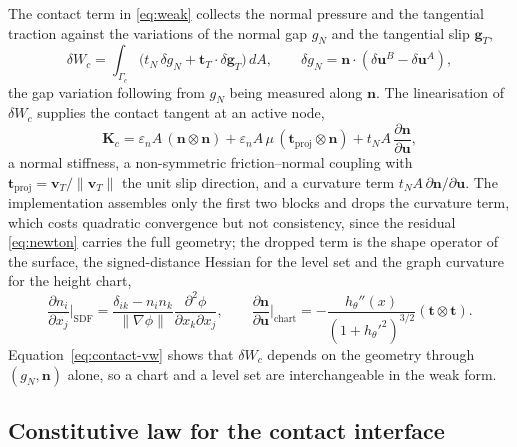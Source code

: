 \documentclass{svjour3}                 %
\newcommand{\norm}[1]{\lVert#1\rVert}
\newcommand{\nbf}{\bm{n}}
\newcommand{\tbf}{\bm{t}}
\newcommand{\ubf}{\bm{u}}
\newcommand{\vbf}{\bm{v}}
\newcommand{\gn}{g_{\scriptscriptstyle N}}
\newcommand{\grad}{\nabla}
\begin{document}
The contact term in \eqref{eq:weak} collects the normal pressure and the tangential traction against the
variations of the normal gap $\gn$ and the tangential slip $\bm g_T$,
\begin{equation}\label{eq:contact-vw}
\delta W_c=\int_{\Gamma_c}\big(t_N\,\delta\gn+\tbf_T\!\cdot\delta\bm g_T\big)\,dA ,\qquad
\delta\gn=\nbf\cdot(\delta\ubf^B-\delta\ubf^A),
\end{equation}
the gap variation following from $\gn$ being measured along $\nbf$. The linearisation of $\delta W_c$ supplies
the contact tangent at an active node,
\begin{equation}\label{eq:contact-tangent}
\bm K_c=\varepsilon_n A\,(\nbf\otimes\nbf)
+\varepsilon_n A\,\mu\,(\tbf_{\mathrm{proj}}\otimes\nbf)
+t_N A\,\frac{\partial\nbf}{\partial\ubf},
\end{equation}
a normal stiffness, a non-symmetric friction--normal coupling with $\tbf_{\mathrm{proj}}=\vbf_T/\norm{\vbf_T}$
the unit slip direction, and a curvature term $t_N A\,\partial\nbf/\partial\ubf$. The implementation assembles
only the first two blocks and drops the curvature term, which costs quadratic convergence but not consistency,
since the residual \eqref{eq:newton} carries the full geometry; the dropped term is the shape operator of the
surface, the signed-distance Hessian for the level set and the graph curvature for the height chart,
\begin{equation}\label{eq:shape-operator}
\frac{\partial n_i}{\partial x_j}\bigg|_{\mathrm{SDF}}
=\frac{\delta_{ik}-n_i n_k}{\norm{\grad\phi}}\frac{\partial^2\phi}{\partial x_k\partial x_j},
\qquad
\frac{\partial\nbf}{\partial\ubf}\bigg|_{\mathrm{chart}}
=-\frac{h_\theta''(x)}{(1+h_\theta'^2)^{3/2}}(\tbf\otimes\tbf).
\end{equation}
Equation~\eqref{eq:contact-vw} shows that $\delta W_c$ depends on the geometry through $(\gn,\nbf)$ alone, so a
chart and a level set are interchangeable in the weak form.

\subsection{Constitutive law for the contact interface}\label{sec:weak:enforce}
\end{document}
